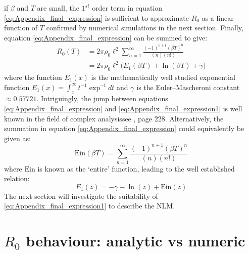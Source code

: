 if $\beta$ and $T$ are small, the $1^{st}$ order term in equation \ref{eq:Appendix_final_expression} is sufficient to approximate $R_0$ as a linear function of $T$\textemdash
confirmed by numerical simulations in the next section. 
Finally, equation \ref{eq:Appendix_final_expression} can be summed to give:
\begin{equation} 
\label{eq:Appendix_final_expression1}
\begin{split}
R_0(T) & = 2\pi\rho_0 \ell^2 \sum^{\infty}_{n=1} \frac{(-1)^{n+1} (\beta T)^n}{(n)(n!)}\\
& =  2\pi\rho_0 \ell^2 \big(E_1(\beta T) + \ln (\beta T) + \gamma\big)
\end{split}
\end{equation}
where the function $E_1(x)$ is the mathematically well studied exponential function $E_1(x)=\int^{\infty}_x t^{-1}\exp^{-t}dt$ and $\gamma$ is the Euler–Mascheroni constant $\approx 0.57721$.
Intriguingly, the jump between equations \ref{eq:Appendix_final_expression} and \ref{eq:Appendix_final_expression1} is well known in the field of complex analysis\textemdash see \cite{abramowitz1948handbook}, page 228.
Alternatively, the summation in equation \ref{eq:Appendix_final_expression} could equivalently be given as:
\begin{equation}
\label{eq:ein}
     \mathrm{Ein}(\beta T) = \sum^{\infty}_{n=1} \frac{(-1)^{n+1} (\beta T)^n}{(n)(n!)}
\end{equation}
where $\mathrm{Ein}$ is known as the `entire' function, leading to the well established relation:
\[
E_1(z) = -\gamma - \ln(z) + \mathrm{Ein}(z)
\]
The next section will investigate the suitability of \ref{eq:Appendix_final_expression1} to describe the NLM.

\section{$R_0$ behaviour: analytic vs numeric}

